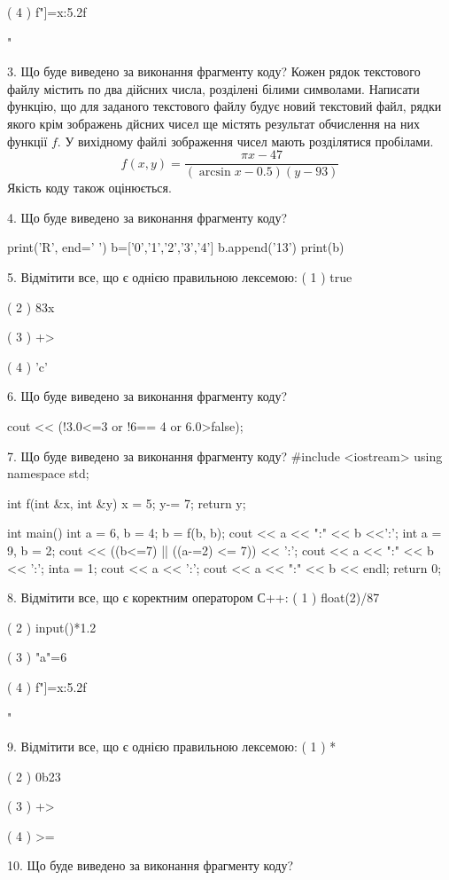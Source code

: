\documentclass[11pt]{article}
\begin{document}
( 4 ) f"]={x:5.2f}{"

3. Що буде виведено за виконання фрагменту коду?
Кожен рядок текстового файлу містить по два дійсних числа, розділені білими символами.
Написати функцію, що для заданого текстового файлу будує новий текстовий файл, рядки якого крім зображень дйсних чисел ще містять результат обчислення на них функції $f$. У вихідному файлі зображення чисел мають розділятися пробілами. 
$$f(x, y) =\frac{\pi x - 47}{(\arcsin x - 0.5) (y - 93)}$$ 
Якість коду також оцінюється.


4. Що буде виведено за виконання фрагменту коду?

print('R', end=' ')
b=['0','1','2','3','4']
b.append('13')
print(b)


5. Відмітити все, що є однією правильною лексемою:
( 1 ) true

( 2 ) 83x

( 3 ) +>

( 4 ) 'c'

6. Що буде виведено за виконання фрагменту коду?

cout << (!3.0<=3 or !6== 4 or 6.0>false);

7. Що буде виведено за виконання фрагменту коду?
#include <iostream>
using namespace std;

int f(int &x, int &y){
    x = 5;
    y-= 7;
    return y;
}

int main(){
    int a = 6, b = 4;
    b = f(b, b);
    cout << a << ":" << b <<':';
    {
        int a = 9, b = 2;
        cout << ((b<=7) || ((a-=2) <= 7)) << ':';
        cout << a << ":" << b << ':';
    }
    {
        inta = 1;
        cout << a << ':';
    }
    cout << a << ":" << b << endl;
    return 0;
}


8. Відмітити все, що є коректним оператором С++:
( 1 ) float(2)/87

( 2 ) input()*1.2

( 3 ) "a"=6

( 4 ) f"]={x:5.2f}{"

9. Відмітити все, що є однією правильною лексемою:
( 1 ) *

( 2 ) 0b23

( 3 ) +>

( 4 ) >=

10. Що буде виведено за виконання фрагменту коду?

}}
\end{document}
